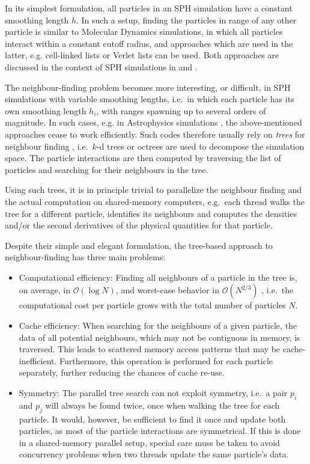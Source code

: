 \documentclass[final]{siamltex}
\newcommand{\oh}[1]
    {\mbox{$ {\mathcal O}( #1 ) $}}
\begin{document}
In its simplest formulation, all particles in an SPH simulation have
a constant smoothing length $h$.
In such a setup, finding the particles in range of any other particle
is similar to Molecular Dynamics simulations, in which all particles
interact within a constant cutoff radius, and approaches which are used
in the latter, e.g. cell-linked lists
\cite{ref:Allen1989} or Verlet lists \cite{ref:Verlet1967} can be used.
Both approaches are discussed in the context of SPH simulations
in \cite{ref:Dominguez2011} and \cite{ref:Viccione2008}.

The neighbour-finding problem becomes more interesting, or difficult,
in SPH simulations with variable smoothing lengths, i.e.~in which
each particle has its own smoothing length $h_i$, with ranges spawning
up to several orders of magnitude.
In such cases, e.g. in Astrophysics simulations \cite{ref:Gingold1977},
the above-mentioned approaches cease to work efficiently.
Such codes therefore usually rely on {\em trees}
for neighbour finding \cite{ref:Hernquist1989,ref:Springel2005,ref:Wadsley2004},
i.e.~$k$-d trees \cite{ref:Bentley1975} or octrees \cite{ref:Meagher1982}
are used to decompose the simulation space. 
The particle interactions are then computed by traversing the list of
particles and searching for their neighbours in the tree.

Using such trees, it is in principle trivial to parallelize
the neighbour finding and the actual computation on shared-memory
computers,
e.g.~each thread walks the tree for a different particle,
identifies its neighbours and computes the densities and/or
the second derivatives of the physical quantities for that particle.

Despite their simple and elegant formulation, the tree-based
approach to neighbour-finding has three main problems:
\begin{itemize}
    \item Computational efficiency: Finding all neighbours
        of a particle in the tree is, on average, in \oh{\log N},
        and worst-case behavior in \oh{N^{2/3}} \cite{ref:Lee1977},
        i.e.~the computational cost per particle grows with the
        total number of particles $N$.
    \item Cache efficiency: When searching for the neighbours of a
        given particle, the data of all potential neighbours, which may
        not be contiguous in memory, is traversed.
        This leads to scattered memory access patterns that may be
        cache-inefficient. Furthermore, this operation is performed for
        each particle separately, further reducing the chances
        of cache re-use.
    \item Symmetry: The parallel tree search can not exploit symmetry,
        i.e.~a pair $p_i$ and $p_j$ will always be found twice,
        once when walking the tree for each particle. It would, however,
        be sufficient to find it once and update both particles, as most
        of the particle interactions are symmetrical.
        If this is done in a shared-memory parallel setup, special
        care muss be taken to avoid concurrency problems when
        two threads update the same particle's data.
\end{itemize}
    
\end{document}
